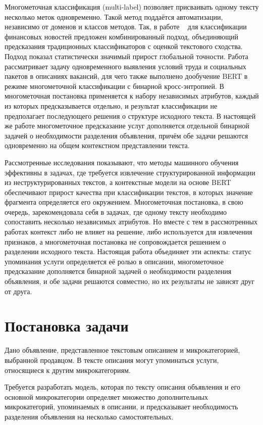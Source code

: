 \documentclass{misisarticle}
\begin{document}
Многометочная классификация (multi-label) позволяет присваивать одному тексту несколько меток одновременно. Такой метод поддаётся автоматизации, независимо от доменов и классов методов. Так, в работе ~\cite{st_finnews} для классификации финансовых новостей предложен комбинированный подход, объединяющий предсказания традиционных классификаторов с оценкой текстового сходства. Подход показал статистически значимый прирост глобальной точности. Работа ~\cite{st_vak2} рассматривает задачу одновременного выявления условий труда и социальных пакетов в описаниях вакансий, для чего также выполнено дообучение BERT в режиме многометочной классификации с бинарной кросс-энтропией. В ~\cite{st_vak2} многометочная постановка применяется к набору независимых атрибутов, каждый из которых предсказывается отдельно, и результат классификации не предполагает последующего решения о структуре исходного текста. В настоящей же работе многометочное предсказание услуг дополняется отдельной бинарной задачей о необходимости разделения объявления, причём обе задачи решаются одновременно на общем контекстном представлении текста.

Рассмотренные исследования показывают, что методы машинного обучения эффективны в задачах, где требуется извлечение структурированной информации из неструктурированных текстов, а контекстные модели на основе BERT обеспечивают прирост качества при классификации текстов, в которых значение фрагмента определяется его окружением. Многометочная постановка, в свою очередь, зарекомендовала себя в задачах, где одному тексту необходимо сопоставить несколько независимых атрибутов. Но вместе с тем в рассмотренных работах контекст либо не влияет на решение, либо используется для извлечения признаков, а многометочная постановка не сопровождается решением о разделении исходного текста. Настоящая работа объединяет эти аспекты: статус упоминания услуги определяется её ролью в описании, многометочное предсказание дополняется бинарной задачей о необходимости разделения объявления, и обе задачи решаются совместно, но их результаты не зависят друг от друга.

\section{Постановка задачи}
Дано объявление, представленное текстовым описанием и микрокатегорией, выбранной продавцом. В тексте описания могут упоминаться услуги, относящиеся к другим микрокатегориям. 

Требуется разработать модель, которая по тексту описания объявления и его основной микрокатегории определяет множество дополнительных микрокатегорий, упоминаемых в описании, и предсказывает необходимость разделения объявления на несколько самостоятельных.
\end{document}
